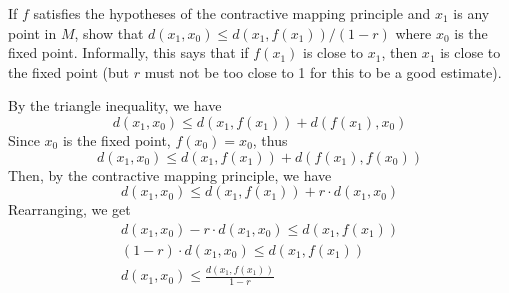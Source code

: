 \documentclass[11pt]{article}
\begin{document}
\begin{homeworkProblem}
    If $f$ satisfies the hypotheses of the contractive mapping principle and $x_1$ is any point in $M$,
    show that $d(x_1, x_0) \leq d(x_1, f (x_1))/(1 - r)$ where $x_0$ is the fixed point. Informally, this says
    that if $f (x_1)$ is close to $x_1$, then $x_1$ is close to the fixed point (but $r$ must not be too close to
    1 for this to be a good estimate). \\

    \solution

    By the triangle inequality, we have
    \[
        d(x_1, x_0) \leq d(x_1, f(x_1)) + d(f(x_1), x_0)
    \]
    Since $x_0$ is the fixed point, $f(x_0) = x_0$, thus
    \[
        d(x_1, x_0) \leq d(x_1, f(x_1)) + d(f(x_1), f(x_0))
    \]
    Then, by the contractive mapping principle, we have
    \[
        d(x_1, x_0) \leq d(x_1, f(x_1)) + r \cdot d(x_1, x_0)
    \]
    Rearranging, we get
    \begin{align*}
        d(x_1, x_0) - r \cdot d(x_1, x_0) \leq d(x_1, f(x_1)) \\
        (1 - r) \cdot d(x_1, x_0) \leq d(x_1, f(x_1))         \\
        d(x_1, x_0) \leq \frac{d(x_1, f(x_1))}{1 - r}
    \end{align*}
\end{homeworkProblem}
\end{document}
